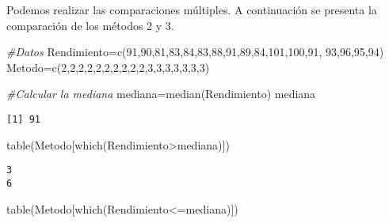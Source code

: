 \documentclass[
  a4paper,
  oneside,
  openany]{book}
\newenvironment{Shaded}{\begin{snugshade}}{\end{snugshade}}
\newcommand{\CommentTok}[1]{\textcolor[rgb]{0.56,0.35,0.01}{\textit{#1}}}
\newcommand{\DecValTok}[1]{\textcolor[rgb]{0.00,0.00,0.81}{#1}}
\newcommand{\FunctionTok}[1]{\textcolor[rgb]{0.00,0.00,0.00}{#1}}
\newcommand{\NormalTok}[1]{#1}
\newcommand{\OtherTok}[1]{\textcolor[rgb]{0.56,0.35,0.01}{#1}}
\newcommand{\SpecialCharTok}[1]{\textcolor[rgb]{0.00,0.00,0.00}{#1}}
\begin{document}
Podemos realizar las comparaciones múltiples. A continuación se presenta la comparación de los métodos 2 y 3.

\begin{Shaded}
\begin{Highlighting}[]
\CommentTok{\#Datos}
\NormalTok{Rendimiento}\OtherTok{=}\FunctionTok{c}\NormalTok{(}\DecValTok{91}\NormalTok{,}\DecValTok{90}\NormalTok{,}\DecValTok{81}\NormalTok{,}\DecValTok{83}\NormalTok{,}\DecValTok{84}\NormalTok{,}\DecValTok{83}\NormalTok{,}\DecValTok{88}\NormalTok{,}\DecValTok{91}\NormalTok{,}\DecValTok{89}\NormalTok{,}\DecValTok{84}\NormalTok{,}\DecValTok{101}\NormalTok{,}\DecValTok{100}\NormalTok{,}\DecValTok{91}\NormalTok{,}
              \DecValTok{93}\NormalTok{,}\DecValTok{96}\NormalTok{,}\DecValTok{95}\NormalTok{,}\DecValTok{94}\NormalTok{)}
\NormalTok{Metodo}\OtherTok{=}\FunctionTok{c}\NormalTok{(}\DecValTok{2}\NormalTok{,}\DecValTok{2}\NormalTok{,}\DecValTok{2}\NormalTok{,}\DecValTok{2}\NormalTok{,}\DecValTok{2}\NormalTok{,}\DecValTok{2}\NormalTok{,}\DecValTok{2}\NormalTok{,}\DecValTok{2}\NormalTok{,}\DecValTok{2}\NormalTok{,}\DecValTok{2}\NormalTok{,}\DecValTok{3}\NormalTok{,}\DecValTok{3}\NormalTok{,}\DecValTok{3}\NormalTok{,}\DecValTok{3}\NormalTok{,}\DecValTok{3}\NormalTok{,}\DecValTok{3}\NormalTok{,}\DecValTok{3}\NormalTok{)}

\CommentTok{\#Calcular la mediana}
\NormalTok{mediana}\OtherTok{=}\FunctionTok{median}\NormalTok{(Rendimiento)}
\NormalTok{mediana}
\end{Highlighting}
\end{Shaded}

\begin{verbatim}
[1] 91
\end{verbatim}

\begin{Shaded}
\begin{Highlighting}[]
\FunctionTok{table}\NormalTok{(Metodo[}\FunctionTok{which}\NormalTok{(Rendimiento}\SpecialCharTok{\textgreater{}}\NormalTok{mediana)])}
\end{Highlighting}
\end{Shaded}

\begin{verbatim}
3 
6 
\end{verbatim}

\begin{Shaded}
\begin{Highlighting}[]
\FunctionTok{table}\NormalTok{(Metodo[}\FunctionTok{which}\NormalTok{(Rendimiento}\SpecialCharTok{\textless{}=}\NormalTok{mediana)])}
\end{Highlighting}
\end{Shaded}
\end{document}
